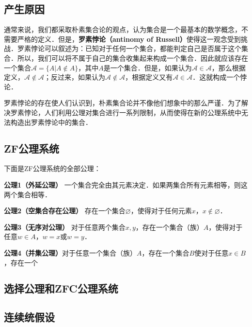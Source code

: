 \begin{issues}
\issueTODO
\end{issues}

\subsection{产生原因}
通常来说，我们都采取朴素集合论的观点，认为集合是一个最基本的数学概念，不需要严格的定义．但是，\textbf{罗素悖论（antinomy of Russell）}使得这一观念受到挑战．罗素悖论可以叙述为：已知对于任何一个集合，都能判定自己是否属于这个集合．所以，我们可以将不属于自己的集合收集起来构成一个集合．因此就应该存在一个集合$\mathcal{A}=\{A|A\notin A\}$，其中$A$是一个集合．但是，如果认为$\mathcal{A}\in\mathcal{A}$，那么根据定义，$\mathcal{A}\notin\mathcal{A}$；反过来，如果认为$\mathcal{A}\notin\mathcal{A}$，根据定义又有$\mathcal{A}\in\mathcal{A}$．这就构成一个悖论．

罗素悖论的存在使人们认识到，朴素集合论并不像他们想象中的那么严谨．为了解决罗素悖论，人们利用公理对集合进行一系列限制，从而使得在新的公理系统中无法构造出罗素悖论中的集合．

\subsection{ZF公理系统}
下面是ZF公理系统的全部公理：

\textbf{公理1（外延公理）} 一个集合完全由其元素决定．如果两集合所有元素相等，则这两个集合相等．

\textbf{公理2（空集合存在公理）} 存在一个集合$\varnothing$，使得对于任何元素$x$，$x\notin\varnothing$．

\textbf{公理3（无序对公理）} 对于任意两个集合$x,y$，存在一个集合（族）$A$，使得对于任意$w\in A$，$w=x$或$w=y$．

\textbf{公理4（并集公理）}对于任意一个集合（族）$A$，存在一个集合$B$使对于任意$x\in B$，存在一个$$

\subsection{选择公理和ZFC公理系统}

\subsection{连续统假设}



